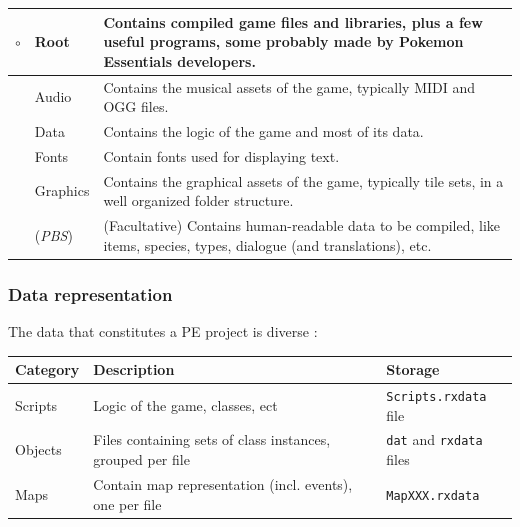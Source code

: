 \documentclass[11pt]{article}
\begin{document}
\begin{tabular}{|r L{.1\linewidth}|L{.8\linewidth}|}
	\hline
	$\circ$ & Root & Contains compiled game files and libraries, plus a few useful programs, some probably made by Pokemon Essentials developers. \\
	\hline
	 & Audio & Contains the musical assets of the game, typically MIDI and OGG files. \\
	\hline
	 & Data & Contains the logic of the game and most of its data.  \\
	\hline
	 & Fonts & Contain fonts used for displaying text. \\
	\hline
	 & Graphics & Contains the graphical assets of the game, typically tile sets, in a well organized folder structure. \\
	\hline
	 & (\textit{PBS}) & (Facultative) Contains human-readable data to be compiled, like items, species, types, dialogue (and translations), etc. \\
	\hline
\end{tabular}




\subsubsection{Data representation}

The data that constitutes a PE project is diverse :

\begin{tabular}{|L{.1\textwidth}|L{.52\textwidth}|L{.3\textwidth}|}
	\hline
	\textbf{Category} & \textbf{Description} & \textbf{Storage} \\
	\hline
	Scripts & Logic of the game, classes, ect & \verb|Scripts.rxdata| file \\
	\hline
	Objects & Files containing sets of class instances, grouped per file & \verb|dat| and \verb|rxdata| files \\
	\hline
	Maps & Contain map representation (incl. events), one per file & \verb|MapXXX.rxdata| \\
	\hline
\end{tabular}
\end{document}
